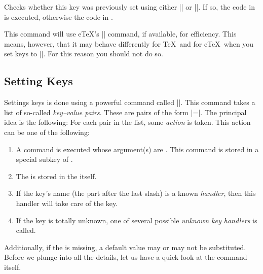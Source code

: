 \begin{command}{\pgfkeysifdefined{}}
    Checks whether this key was previously set using either |\pgfkeyssetvalue|
    or |\pgfkeyslet|. If so, the code in  is executed, otherwise the
    code in .

    This command will use e\TeX's |\ifcsname| command, if available, for
    efficiency. This means, however, that it may behave differently for \TeX\
    and for e\TeX\ when you set keys to |\relax|. For this reason you should
    not do so.
\begin{codeexample}[]
\end{codeexample}
\end{command}


\subsection{Setting Keys}

Settings keys is done using a powerful command called |\pgfkeys|. This command
takes a list of so-called \emph{key--value pairs}. These are pairs of the form
\meta{key}|=|\meta{value}. The principal idea is the following: For each pair
in the list, some \emph{action} is taken. This action can be one of the
following:
%
\begin{enumerate}
    \item A command is executed whose argument(s) are . This
        command is stored in a special subkey of .
    \item The \meta{value} is stored in the \meta{key} itself.
    \item If the key's name (the part after the last slash) is a known
        \emph{handler}, then this handler will take care of the key.
    \item If the key is totally unknown, one of several possible \emph{unknown
        key handlers} is called.
\end{enumerate}

Additionally, if the  is missing, a default value may or may not be
substituted. Before we plunge into all the details, let us have a quick look at
the command itself.

